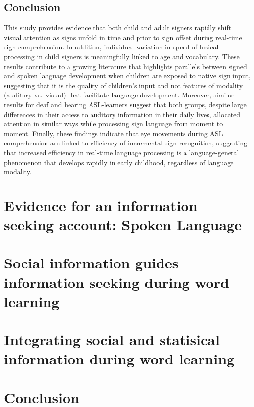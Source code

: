 \documentclass[oneside]{report}
\begin{document}
\hypertarget{conclusion}{%
\section{Conclusion}\label{conclusion}}

This study provides evidence that both child and adult signers rapidly
shift visual attention as signs unfold in time and prior to sign offset
during real-time sign comprehension. In addition, individual variation
in speed of lexical processing in child signers is meaningfully linked
to age and vocabulary. These results contribute to a growing literature
that highlights parallels between signed and spoken language development
when children are exposed to native sign input, suggesting that it is
the quality of children's input and not features of modality (auditory
vs.~visual) that facilitate language development. Moreover, similar
results for deaf and hearing ASL-learners suggest that both groups,
despite large differences in their access to auditory information in
their daily lives, allocated attention in similar ways while processing
sign language from moment to moment. Finally, these findings indicate
that eye movements during ASL comprehension are linked to efficiency of
incremental sign recognition, suggesting that increased efficiency in
real-time language processing is a language-general phenomenon that
develops rapidly in early childhood, regardless of language modality.

\hypertarget{speed-fam}{%
\chapter{Evidence for an information seeking account: Spoken
Language}\label{speed-fam}}

\hypertarget{soc-xsit}{%
\chapter{Social information guides information seeking during word
learning}\label{soc-xsit}}

\hypertarget{speed-nov}{%
\chapter{Integrating social and statisical information during word
learning}\label{speed-nov}}

\hypertarget{conclusion}{%
\chapter{Conclusion}\label{conclusion}}
\end{document}
